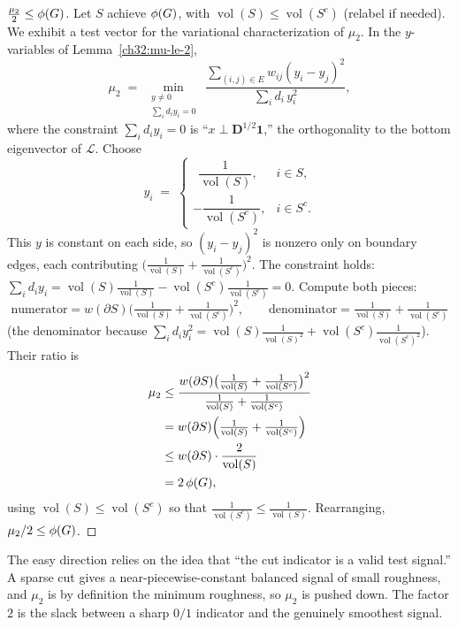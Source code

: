 \begin{proof}[$\tfrac{\mu_2}{2}\le\phi(G)$]
Let $S$ achieve $\phi(G)$, with $\operatorname{vol}(S)\le\operatorname{vol}(S^c)$ (relabel if needed). We exhibit a test vector for the variational characterization of $\mu_2$. In the $y$-variables of Lemma~\ref{ch32:mu-le-2},
\[
  \mu_2 \;=\; \min_{\substack{y\ne 0\\ \sum_i d_i y_i = 0}}\ \frac{\sum_{(i,j)\in E} w_{ij}(y_i-y_j)^2}{\sum_i d_i\, y_i^2},
\]
where the constraint $\sum_i d_i y_i=0$ is ``$x\perp\mathbf{D}^{1/2}\mathbf1$,'' the orthogonality to the bottom eigenvector of $\mathcal{L}$. Choose
\[
  y_i \;=\;
  \begin{cases}
    \ \ \dfrac{1}{\operatorname{vol}(S)}, & i\in S,\\[2ex]
    -\dfrac{1}{\operatorname{vol}(S^c)}, & i\in S^c.
  \end{cases}
\]
This $y$ is constant on each side, so $(y_i-y_j)^2$ is nonzero only on boundary edges, each contributing $\big(\tfrac{1}{\operatorname{vol}(S)}+\tfrac{1}{\operatorname{vol}(S^c)}\big)^2$. The constraint holds: $\sum_i d_i y_i=\operatorname{vol}(S)\tfrac{1}{\operatorname{vol}(S)}-\operatorname{vol}(S^c)\tfrac{1}{\operatorname{vol}(S^c)}=0$. Compute both pieces:
\[
  \text{numerator}=w(\partial S)\Big(\tfrac{1}{\operatorname{vol}(S)}+\tfrac{1}{\operatorname{vol}(S^c)}\Big)^2,
  \qquad
  \text{denominator}=\tfrac{1}{\operatorname{vol}(S)}+\tfrac{1}{\operatorname{vol}(S^c)}
\]
(the denominator because $\sum_i d_i y_i^2=\operatorname{vol}(S)\tfrac{1}{\operatorname{vol}(S)^2}+\operatorname{vol}(S^c)\tfrac{1}{\operatorname{vol}(S^c)^2}$). Their ratio is
\begin{align*}
  \mu_2 &\le \frac{w(\partial S)\big(\tfrac{1}{\operatorname{vol}(S)}+\tfrac{1}{\operatorname{vol}(S^c)}\big)^2}
                  {\tfrac{1}{\operatorname{vol}(S)}+\tfrac{1}{\operatorname{vol}(S^c)}} \\
        &= w(\partial S)\Big(\tfrac{1}{\operatorname{vol}(S)}+\tfrac{1}{\operatorname{vol}(S^c)}\Big) \\
        &\le w(\partial S)\cdot\frac{2}{\operatorname{vol}(S)} \\
        &= 2\,\phi(G),
\end{align*}
using $\operatorname{vol}(S)\le\operatorname{vol}(S^c)$ so that $\tfrac1{\operatorname{vol}(S^c)}\le\tfrac1{\operatorname{vol}(S)}$. Rearranging, $\mu_2/2\le\phi(G)$.
\end{proof}

\begin{intuitionbox}
The easy direction relies on the idea that ``the cut indicator is a valid test signal.'' A sparse cut gives a near-piecewise-constant balanced signal of small roughness, and $\mu_2$ is by definition the minimum roughness, so $\mu_2$ is pushed down. The factor $2$ is the slack between a sharp $0/1$ indicator and the genuinely smoothest signal.
\end{intuitionbox}

